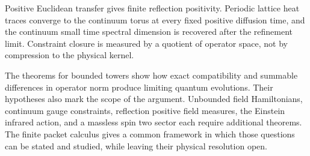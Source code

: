 Positive Euclidean transfer gives finite reflection positivity. Periodic lattice heat traces converge to the continuum torus at every fixed positive diffusion time, and the continuum small time spectral dimension is recovered after the refinement limit. Constraint closure is measured by a quotient of operator space, not by compression to the physical kernel.

The theorems for bounded towers show how exact compatibility and summable differences in operator norm produce limiting quantum evolutions. Their hypotheses also mark the scope of the argument. Unbounded field Hamiltonians, continuum gauge constraints, reflection positive field measures, the Einstein infrared action, and a massless spin two sector each require additional theorems. The finite packet calculus gives a common framework in which those questions can be stated and studied, while leaving their physical resolution open.


